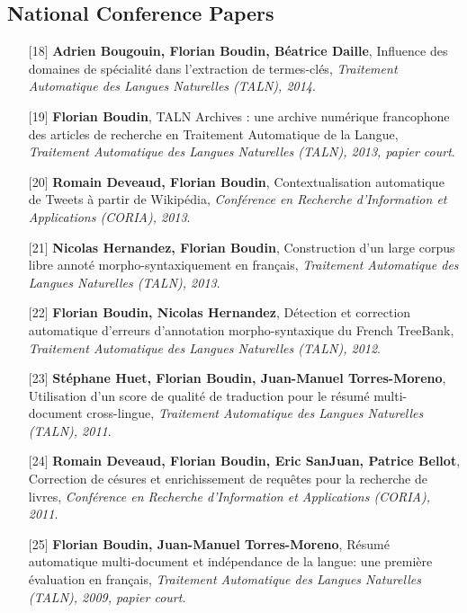 \documentclass[11pt,a4paper]{moderncv}
\begin{document}
    \subsection{National Conference Papers}
    \begin{itemize}[leftmargin=1.2cm,itemsep=0.1cm]
        \item[{\small$[$18$]$}] \textbf{Adrien Bougouin, Florian Boudin, Béatrice Daille}, Influence des domaines de spécialité dans l’extraction de termes-clés, \textit{Traitement Automatique des Langues Naturelles (TALN), 2014}.
        \item[{\small$[$19$]$}] \textbf{Florian Boudin}, TALN Archives : une archive numérique francophone des articles de recherche en Traitement Automatique de la Langue, \textit{Traitement Automatique des Langues Naturelles (TALN), 2013, papier court}.
        \item[{\small$[$20$]$}] \textbf{Romain Deveaud, Florian Boudin}, Contextualisation automatique de Tweets à partir de Wikipédia, \textit{Conférence en Recherche d'Information et Applications (CORIA), 2013}.
        \item[{\small$[$21$]$}] \textbf{Nicolas Hernandez, Florian Boudin}, Construction d'un large corpus libre annoté morpho-syntaxiquement en français, \textit{Traitement Automatique des Langues Naturelles (TALN), 2013}.
        \item[{\small$[$22$]$}] \textbf{Florian Boudin, Nicolas Hernandez}, Détection et correction automatique d'erreurs d'annotation morpho-syntaxique du French TreeBank, \textit{Traitement Automatique des Langues Naturelles (TALN), 2012}.
        \item[{\small$[$23$]$}] \textbf{Stéphane Huet, Florian Boudin, Juan-Manuel Torres-Moreno}, Utilisation d'un score de qualité de traduction pour le résumé multi-document cross-lingue, \textit{Traitement Automatique des Langues Naturelles (TALN), 2011}.
        \item[{\small$[$24$]$}] \textbf{Romain Deveaud, Florian Boudin, Eric SanJuan, Patrice Bellot}, Correction de césures et enrichissement de requêtes pour la recherche de livres, \textit{Conférence en Recherche d'Information et Applications (CORIA), 2011}.
        \item[{\small$[$25$]$}] \textbf{Florian Boudin, Juan-Manuel Torres-Moreno}, Résumé automatique multi-document et indépendance de la langue: une première évaluation en français, \textit{Traitement Automatique des Langues Naturelles (TALN), 2009, papier court}.
    \end{itemize}
\end{document}
